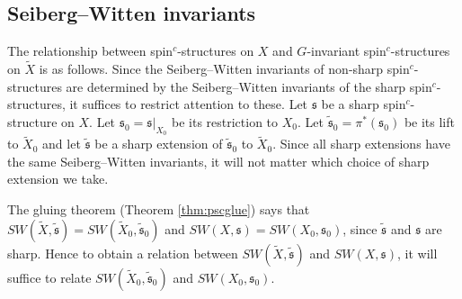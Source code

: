 \documentclass{amsart}
\theoremstyle{definition}
\theoremstyle{remark}
\numberwithin{equation}{section}
\begin{document}
\subsection{Seiberg--Witten invariants}\label{sec:sw}

The relationship between spin$^c$-structures on $X$ and $G$-invariant spin$^c$-structures on $\widetilde{X}$ is as follows. Since the Seiberg--Witten invariants of non-sharp spin$^c$-structures are determined by the Seiberg--Witten invariants of the sharp spin$^c$-structures, it suffices to restrict attention to these. Let $\mathfrak{s}$ be a sharp spin$^c$-structure on $X$. Let $\mathfrak{s}_0 = \mathfrak{s}|_{X_0}$ be its restriction to $X_0$. Let $\widetilde{\mathfrak{s}}_0 = \pi^*(\mathfrak{s}_0)$ be its lift to $\widetilde{X}_0$ and let $\widetilde{\mathfrak{s}}$ be a sharp extension of $\widetilde{\mathfrak{s}}_0$ to $\widetilde{X}_0$. Since all sharp extensions have the same Seiberg--Witten invariants, it will not matter which choice of sharp extension we take.

The gluing theorem (Theorem \ref{thm:pscglue}) says that $SW(\widetilde{X} , \widetilde{\mathfrak{s}}) = SW(\widetilde{X}_0 , \widetilde{\mathfrak{s}}_0)$ and $SW(X , \mathfrak{s}) = SW(X_0 , \mathfrak{s}_0)$, since $\widetilde{\mathfrak{s}}$ and $\mathfrak{s}$ are sharp. Hence to obtain a relation between $SW(\widetilde{X} , \widetilde{\mathfrak{s}})$ and $SW(X , \mathfrak{s})$, it will suffice to relate $SW(\widetilde{X}_0 , \widetilde{\mathfrak{s}}_0)$ and $SW(X_0 , \mathfrak{s}_0)$.
\end{document}
